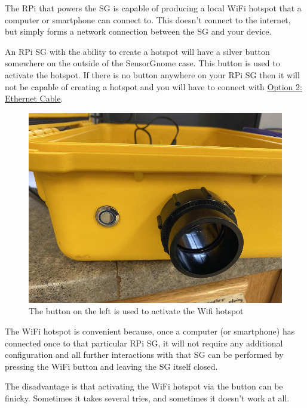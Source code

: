 \documentclass[
]{book}
\begin{document}
The RPi that powers the SG is capable of producing a local WiFi hotspot that a computer or smartphone can connect to. This doesn't connect to the internet, but simply forms a network connection between the SG and your device.

An RPi SG with the ability to create a hotspot will have a silver button somewhere on the outside of the SensorGnome case. This button is used to activate the hotspot. If there is no button anywhere on your RPi SG then it will not be capable of creating a hotspot and you will have to connect with \protect\hyperlink{ethernet}{Option 2: Ethernet Cable}.

\begin{figure}
\includegraphics[width=11.11in]{images/wifibutton} \caption{The button on the left is used to activate the Wifi hotspot}\label{fig:unnamed-chunk-1}
\end{figure}

The WiFi hotspot is convenient because, once a computer (or smartphone) has connected once to that particular RPi SG, it will not require any additional configuration and all further interactions with that SG can be performed by pressing the WiFi button and leaving the SG itself closed.

The disadvantage is that activating the WiFi hotspot via the button can be finicky. Sometimes it takes several tries, and sometimes it doesn't work at all.
\end{document}
